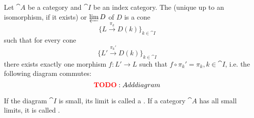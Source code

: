 \begin{definition}\label{def:categorical_limit}\mcite\cite[def. 5.1.19(b), 6.3.6]{Leinster2016Basic}
  Let \( \cat{A} \) be a category and \( \cat{I} \) be an index category. The (unique up to an isomorphism, if it exists)  or  \( \varprojlim D \) of \( D \) is a cone
  \begin{equation*}
    \{ L \overset {\pi_k} \to D(k) \}_{k \in \cat{I}}
  \end{equation*}
  such that for every cone
  \begin{equation*}
    \{ L' \overset {\pi_k'} \to D(k) \}_{k \in \cat{I}}
  \end{equation*}
  there exists exactly one morphism \( f: L' \to L \) such that \( f \circ \pi_k' = \pi_k, k \in \cat{I} \), i.e. the following diagram commutes:
  \begin{equation*}
    \todo{Add diagram}\iffalse\begin{mplibcode}
      beginfig(1);
      input metapost/graphs;

      v1 := thelabel("$D(k)$", origin);
      v2 := thelabel("$L'$", (-1, 1) scaled u);
      v3 := thelabel("$L$", (1, 1) scaled u);

      a1 := straight_arc(v2, v1);
      a2 := straight_arc(v3, v1);

      d1 := straight_arc(v2, v3);

      draw_vertices(v);
      draw_arcs(a);

      drawarrow d1 dotted;

      label.llft("$\pi_k$", straight_arc_midpoint of a1);
      label.lrt("$\pi_k'$", straight_arc_midpoint of a2);
      label.top("$f$", straight_arc_midpoint of d1);
      endfig;
    \end{mplibcode}\fi
  \end{equation*}

  If the diagram \( \cat{I} \) is small, its limit is called a . If a category \( \cat{A} \) has all small limits, it is called .
\end{definition}

